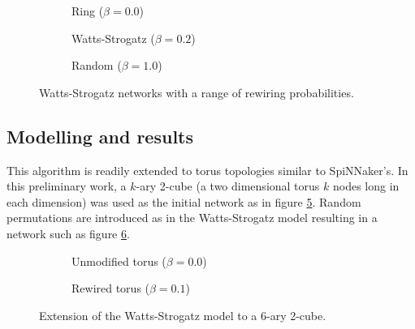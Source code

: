 			\begin{figure}
				\center
				\begin{subfigure}[t]{0.3\textwidth}
					\center
					
					\caption{Ring ($\beta = 0.0$)}
					\label{fig:ringNetworkB0}
				\end{subfigure}
				\begin{subfigure}[t]{0.3\textwidth}
					\center
					
					\caption{Watts-Strogatz ($\beta = 0.2$)}
					\label{fig:ringNetworkB02}
				\end{subfigure}
				\begin{subfigure}[t]{0.3\textwidth}
					\center
					
					\caption{Random ($\beta = 1.0$)}
					\label{fig:ringNetworkB1}
				\end{subfigure}
				
				\caption{Watts-Strogatz networks with a range of rewiring
				probabilities.}
				\label{fig:ringNetwork}
			\end{figure}
		
		\subsection{Modelling and results}
			
			
			This algorithm is readily extended to torus topologies similar to
			SpiNNaker's. In this preliminary work, a $k$-ary 2-cube (a two dimensional
			torus $k$ nodes long in each dimension) was used as the initial network as
			in figure \ref{fig:torusNetworkB0}.  Random permutations are introduced as
			in the Watts-Strogatz model resulting in a network such as figure
			\ref{fig:torusNetworkB01}.
			
			\begin{figure}
				\center
				\begin{subfigure}[t]{0.45\textwidth}
					\center
					
					\caption{Unmodified torus ($\beta=0.0$)}
					\label{fig:torusNetworkB0}
				\end{subfigure}
				\begin{subfigure}[t]{0.45\textwidth}
					\center
					
					\caption{Rewired torus ($\beta=0.1$)}
					\label{fig:torusNetworkB01}
				\end{subfigure}
				
				\caption{Extension of the Watts-Strogatz model to a 6-ary 2-cube.}
				\label{fig:torusNetwork}
			\end{figure}
			
